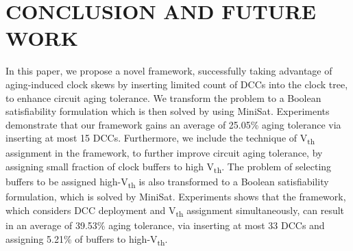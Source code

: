 \section{CONCLUSION AND FUTURE WORK}
\label{sec:conclude}
In this paper, we propose a novel framework, successfully taking advantage of aging-induced clock skews by inserting limited count of DCCs into the clock tree, to enhance circuit aging tolerance. We transform the problem to a Boolean satisfiability formulation which is then solved by using MiniSat. Experiments demonstrate that our framework gains an average of 25.05\% aging tolerance via inserting at most 15 DCCs. Furthermore, we include the technique of V\textsubscript{th} assignment in the framework, to further improve circuit aging tolerance, by assigning small fraction of clock buffers to high V\textsubscript{th}. The problem of selecting buffers to be assigned high-V\textsubscript{th} is also transformed to a Boolean satisfiability formulation, which is solved by MiniSat. Experiments shows that the framework, which considers DCC deployment and V\textsubscript{th} assignment simultaneously, can result in an average of 39.53\% aging tolerance, via inserting at most 33 DCCs and assigning 5.21\% of buffers to high-V\textsubscript{th}.


